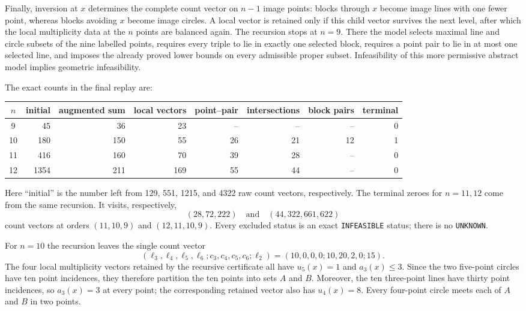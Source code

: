 Finally, inversion at $x$ determines the complete count vector on $n-1$ image
points: blocks through $x$ become image lines with one fewer point, whereas
blocks avoiding $x$ become image circles.  A local vector is retained only if this
child vector survives the next level, after which the local multiplicity data
at the $n$ points are balanced again.  The recursion stops at $n=9$.  There the model
selects maximal line and circle subsets of the nine labelled points, requires
every triple to lie in exactly one selected block, requires a point pair to
lie in at most one selected line, and imposes the already proved lower bounds
on every admissible proper subset.  Infeasibility of this more permissive
abstract model implies geometric infeasibility.

The exact counts in the final replay are:
\begin{center}
\small
\begin{tabular}{c|rrrrrrr}
\toprule
$n$ & initial & augmented sum & local vectors & point--pair & intersections & block pairs & terminal\\
\midrule
9  &45   &36  &23  &-- &-- &-- &0\\
10 &180  &150 &55  &26 &21 &12 &1\\
11 &416  &160 &70  &39 &28 &-- &0\\
12 &1354 &211 &169 &55 &44 &-- &0\\
\bottomrule
\end{tabular}
\end{center}
Here ``initial'' is the number left from 129, 551, 1215, and 4322 raw
count vectors, respectively.  The terminal zeroes for $n=11,12$ come from the
same recursion.  It visits, respectively,
\[
 (28,72,222)\quad\text{and}\quad(44,322,661,622)
\]
count vectors at orders $(11,10,9)$ and $(12,11,10,9)$.  Every excluded status
is an exact \texttt{INFEASIBLE} status; there is no \texttt{UNKNOWN}.

For $n=10$ the recursion leaves the single count vector
\[
 (\ell_3,\ell_4,\ell_5,\ell_6;
   c_3,c_4,c_5,c_6;\ell_2)
 =(10,0,0,0;10,20,2,0;15).
\]
The four local multiplicity vectors retained by the recursive certificate all have
$u_5(x)=1$ and $a_3(x)\le3$.  Since the two five-point circles have ten point
incidences, they therefore partition the ten points into sets $A$ and $B$.
Moreover, the ten three-point lines have thirty point incidences, so
$a_3(x)=3$ at every point; the corresponding retained vector also has
$u_4(x)=8$.  Every four-point circle meets each of $A$ and $B$ in two points.

